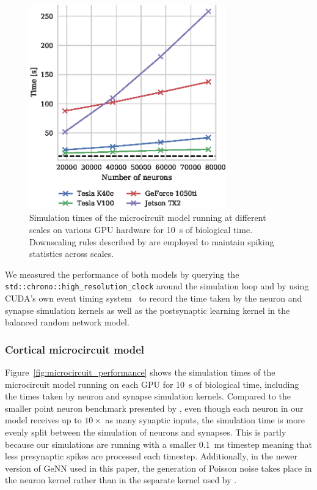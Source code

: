 \documentclass[utf8]{frontiersSCNS} %
\begin{document}
\begin{figure}
    \begin{center}
        \includegraphics[width=85mm]{figures/microcircuit_scaling}
    \end{center}
    \caption{Simulation times of the microcircuit model running at different scales on various GPU hardware for \SI{10}{\second} of biological time.
    Downscaling rules described by \citet{VanAlbada2015} are employed to maintain spiking statistics across scales.}
    \label{fig:microcircuit_performance_scaling}
\end{figure}

We measured the performance of both models by querying the \lstinline{std::chrono::high_resolution_clock} around the simulation loop and by using CUDA's own event timing system~\citep[Section~3.2.5.6.2]{NVIDIACorporation2018} to record the time taken by the neuron and synapse simulation kernels as well as the postsynaptic learning kernel in the balanced random network model.

\subsubsection{Cortical microcircuit model}
\label{sec:results/performance/microcircuit}
Figure~\ref{fig:microcircuit_performance} shows the simulation times of the microcircuit model running on each GPU for \SI{10}{\second} of biological time, including the times taken by neuron and synapse simulation kernels.
Compared to the smaller point neuron benchmark presented by \citet{Yavuz2016}, even though each neuron in our model receives up to $10\times$ as many synaptic inputs, the simulation time is more evenly split between the simulation of neurons and synapses.
This is partly because our simulations are running with a smaller \SI{0.1}{\milli\second} timestep meaning that less presynaptic spikes are processed each timestep.
Additionally, in the newer version of GeNN used in this paper, the generation of Poisson noise takes place in the neuron kernel rather than in the separate kernel used by \citeauthor{Yavuz2016}.
\end{document}
